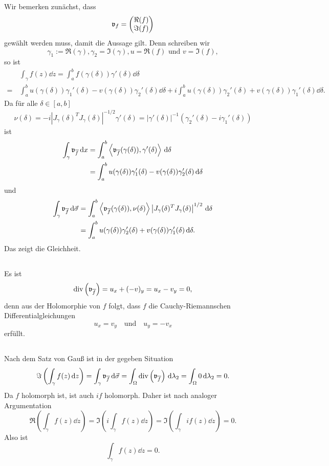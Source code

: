 \documentclass[a4paper,10pt]{article}
\begin{document}
\subsection{}
Wir bemerken zunächst, dass
\[
 \mathfrak{v}_f = \begin{pmatrix}\Re(f) \\ \Im(f)\end{pmatrix}
\]
gewählt werden muss, damit die Aussage gilt. Denn schreiben wir
\[
 \gamma_1 := \Re(\gamma), \gamma_2 = \Im(\gamma), u = \Re(f) \text{ und } v = \Im(f),
\]
so ist
\begin{align*}
 &\, \int_\gamma f(z) \dd{z}
 = \int_a^b f(\gamma(\delta)) \gamma'(\delta) \dd{\delta} \\
 =&\, \int_a^b u(\gamma(\delta))\gamma_1'(\delta) - v(\gamma(\delta))\gamma_2'(\delta) \dd{\delta}
   + i \int_a^b u(\gamma(\delta)) \gamma_2'(\delta) + v(\gamma(\delta)) \gamma_1'(\delta) \dd{\delta}.
\end{align*}
Da für alle $\delta \in [a,b]$
\begin{align*}
 \nu(\delta) = -i\left|J_\gamma(\delta)^T J_\gamma(\delta)\right|^{-1/2} \gamma'(\delta) = |\gamma'(\delta)|^{-1} \left(\gamma_2'(\delta) - i\gamma_1'(\delta)\right)
\end{align*}
ist
\begin{align*}
 \int_\gamma \mathfrak{v}_{\overline{f}} \,\text{d}x
 &= \int_a^b \left\langle \mathfrak{v}_{\overline{f}}(\gamma(\delta)), \gamma'(\delta) \right\rangle \,\text{d}\delta \\
 &= \int_a^b u(\gamma(\delta))\gamma_1'(\delta) - v(\gamma(\delta))\gamma_2'(\delta) \,\text{d}\delta
\end{align*}
und
\begin{align*}
 \int_\gamma \mathfrak{v}_{\overline{f}} \,\text{d}\vec{\sigma}
 &= \int_a^b \left\langle \mathfrak{v}_{\overline{f}}(\gamma(\delta)), \nu(\delta) \right\rangle \left|J_\gamma(\delta)^T J_\gamma(\delta)\right|^{1/2} \,\text{d}\delta \\
 &= \int_a^b u(\gamma(\delta))\gamma_2'(\delta) + v(\gamma(\delta))\gamma_1'(\delta) \,\text{d}\delta.
\end{align*}
Das zeigt die Gleichheit.


\subsection{}
Es ist
\[
 \operatorname{div}\left( \mathfrak{v}_{\overline{f}} \right)
 = u_x + (-v)_y
 = u_x - v_y
 = 0,
\]
denn aus der Holomorphie von $f$ folgt, dass $f$ die Cauchy-Riemannschen Differentialgleichungen
\[
 u_x = v_y \quad \text{und} \quad u_y = -v_x
\]
erfüllt.


\subsection{}
Nach dem Satz von Gauß ist in der gegeben Situation
\[
 \Im\left( \int_\gamma f(z) \,\text{d}z \right)
 = \int_\gamma \mathfrak{v}_{\overline{f}} \,\text{d}\vec{\sigma}
 = \int_\Omega \operatorname{div}\left(\mathfrak{v}_{\overline{f}}\right) \,\text{d}\lambda_2
 = \int_\Omega 0 \,\text{d}\lambda_2
 = 0.
\]
Da $f$ holomorph ist, ist auch $if$ holomorph. Daher ist nach analoger Argumentation
\[
 \Re\left( \int_\gamma f(z) \dd{z} \right)
 = \Im\left( i \int_\gamma f(z) \dd{z} \right)
 = \Im\left( \int_\gamma if(z) \dd{z} \right)
 = 0.
\]
Also ist
\[
 \int_\gamma f(z) \dd{z} = 0.
\]
\end{document}
